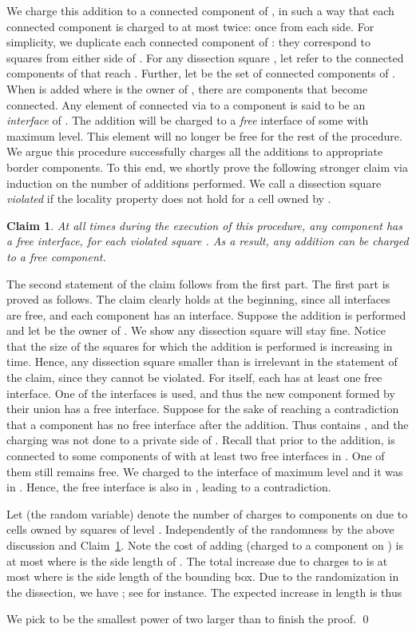 \documentclass[extras,11pt]{article} \usepackage{fullpage}
\theoremstyle{mytheorem}
\newtheorem{claim}[theorem]{Claim}
\newenvironment{proofof}[1]{\par\noindent{\bf #1.}\hspace{0.5em}}
    {\hfill\qed\vspace{1ex}}
\begin{document}
\begin{proofof}{\proofname\ of Theorem~\ref{thm:locality}}
We charge this addition to a connected component of ,
 in such a way that each connected component is charged to at most twice: once from each side.
For simplicity, we duplicate each connected component of : they correspond to squares from either side of .
For any dissection square , let   refer to the connected components of  that reach .
Further, let  be the set of connected components of .
When  is  added where  is the owner of ,
there are  components  that become connected.
Any element of  connected via  to a component 
is said to be an \emph{interface} of .
The addition will be charged to a \emph{free} interface of some 
with maximum level. This element will no longer be free
for the rest of the procedure.
We argue this procedure  successfully charges all the additions to appropriate border components.
To this end, we shortly prove the following stronger claim via induction on the number of additions performed.
We call a dissection square  \emph{violated} if the locality property does not hold for a cell  owned by .
\begin{claim}\label{clm:cij}
At all times during the execution of this procedure,
any component  has a free interface,
for each violated square .
As a result, any addition can be charged to a free component.
\end{claim}
The second statement of the claim follows from the first part.
The first part is proved as follows.
The claim clearly holds at the beginning, 
since all interfaces are free, and each component has an interface.
Suppose the addition  is performed and let  be the owner of .
We show any dissection square  will stay fine.
Notice that the size of the squares  for which the addition is performed is increasing in time.
Hence, any dissection square  smaller than  is irrelevant in the statement of the claim, since they cannot be violated.
For  itself, each  has at least one free interface.
One of the interfaces is used, and thus the new component formed by their union has a free interface.
Suppose for the sake of reaching a contradiction that
a component  has no free interface after the addition.
Thus   contains ,
and the charging was not done to a private side of .
Recall that prior to the addition,  is connected to some components of  with at least two free interfaces in .
One of them still remains free.
We charged to the interface of maximum level and it was in .
Hence, the free interface is also in , leading to a contradiction.

Let (the random variable)  denote the number of charges to components on  due to cells  owned by squares  of level .
Independently of the randomness  by the above discussion and Claim~\ref{clm:cij}.
Note the cost of adding  (charged to a component on )
is at most  where  is the side length of .
The total increase due to charges to  is at most  where  is the side length of  the bounding box. Due to the randomization in the dissection, 
we have
; see \cite{arora98:ptas} for instance.
The expected increase in length is thus

\noindent We pick  to be the smallest power of two larger than 
to finish the proof.
\end{proofof}
\end{document}
